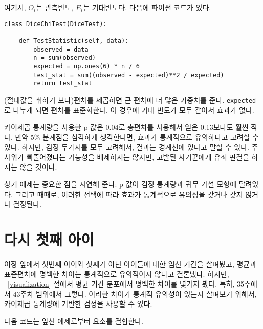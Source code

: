 여기서, $O_i$는 관측빈도, $E_i$는 기대빈도다. 다음에 파이썬 코드가 있다.

\begin{verbatim}
class DiceChiTest(DiceTest):

    def TestStatistic(self, data):
        observed = data
        n = sum(observed)
        expected = np.ones(6) * n / 6
        test_stat = sum((observed - expected)**2 / expected)
        return test_stat
\end{verbatim}

(절대값을 취하기 보다)편차를 제곱하면 큰 편차에 더 많은 가중치를 준다.
{\tt expected}로 나누게 되면 편차를 표준화한다. 이 경우에 기대 빈도가 모두 같아서 효과가 없다.


카이제곱 통계량을 사용한 p-값은 0.04로 총편차를 사용해서 얻은 0.13보다도 훨씬 작다. 만약 5\% 분계점을 심각하게 생각한다면, 효과가 통계적으로 유의하다고 고려할 수 있다. 하지만, 검정 두가지를 모두 고려해서, 결과는 경계선에 있다고 말할 수 있다. 주사위가 삐뚤어졌다는 가능성을 배제하지는 않지만, 고발된 사기꾼에게 유죄 판결을 하지는 않을 것이다.


상기 예제는 중요한 점을 시연해 준다: p-값이 검정 통계량과 귀무 가설 모형에 달려있다. 그리고 때때로, 이러한 선택에 따라 효과가 통계적으로 유의성을 갖거나 갖지 않거나 결정된다.


\section{다시 첫째 아이}

이장 앞에서 첫번째 아이와 첫째가 아닌 아이들에 대한 임신 기간을 살펴봤고, 평균과 표준편차에 명백한 차이는 통계적으로 유의적이지 않다고 결론냈다. 하지만, ~\ref{visualization} 절에서 평균 기간 분포에서 명백한 차이를 몇가지 봤다. 특히, 35주에서 43주차 범위에서 그렇다. 이러한 차이가 통계적 유의성이 있는지 살펴보기 위해서, 카이제곱 통계량에 기반한 검정을 사용할 수 있다.

다음 코드는 앞선 예제로부터 요소를 결합한다.


